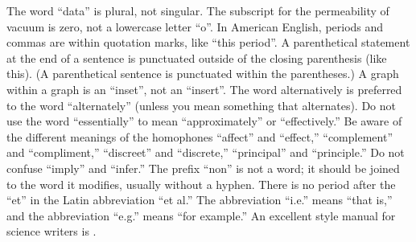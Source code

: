 The word ``data'' is plural, not singular. The subscript for the
permeability of vacuum is zero, not a lowercase letter ``o''. In American
English, periods and commas are within quotation marks, like ``this
period''. A parenthetical statement at the end of a sentence is punctuated
outside of the closing parenthesis (like this). (A parenthetical sentence
is punctuated within the parentheses.) A graph within a graph is an
``inset'', not an ``insert''. The word alternatively is preferred to the
word ``alternately'' (unless you mean something that alternates). Do not
use the word ``essentially'' to mean ``approximately'' or ``effectively.''
Be aware of the different meanings of the homophones  ``affect'' and
``effect,'' ``complement'' and ``compliment,'' ``discreet'' and
``discrete,'' ``principal'' and ``principle.'' Do not confuse ``imply''
and ``infer.'' The prefix ``non'' is not a word; it should be joined to
the word it modifies, usually without a hyphen. There is no period after
the ``et'' in the Latin abbreviation ``et al.'' The abbreviation ``i.e.''
means ``that is,'' and the abbreviation ``e.g.'' means ``for example.'' An
excellent style manual for science writers is \cite{young}.




%


%



